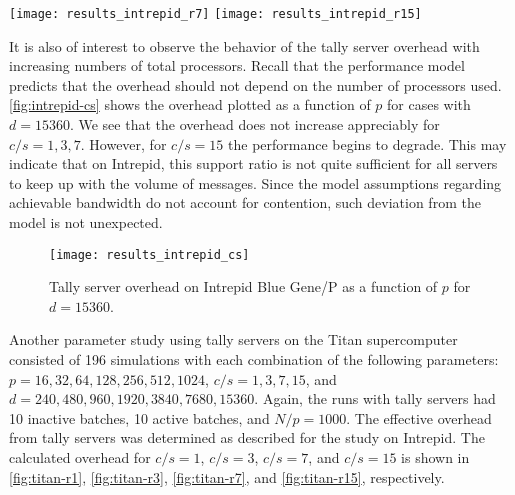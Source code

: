 \documentclass[3p,fleqn]{elsarticle}
\begin{document}
\begin{figure*}[!th]
  \begin{floatrow}
     {\texttt{[image: results\_intrepid\_r7]}}
     {\texttt{[image: results\_intrepid\_r15]}}
  \end{floatrow}
\end{figure*}

It is also of interest to observe the behavior of the tally server overhead with
increasing numbers of total processors. Recall that the performance model
predicts that the overhead should not depend on the number of processors
used. \autoref{fig:intrepid-cs} shows the overhead plotted as a function of $p$
for cases with $d = 15360$. We see that the overhead does not increase
appreciably for $c/s = 1, 3, 7$. However, for $c/s = 15$ the performance begins
to degrade. This may indicate that on Intrepid, this support ratio is not quite
sufficient for all servers to keep up with the volume of messages. Since the
model assumptions regarding achievable bandwidth do not account for contention,
such deviation from the model is not unexpected.

\begin{figure}[!tbh]
  \centering
  \texttt{[image: results\_intrepid\_cs]}
  \caption{Tally server overhead on Intrepid Blue Gene/P as a function of $p$
    for $d = 15360$.}
  \label{fig:intrepid-cs}
\end{figure}

Another parameter study using tally servers on the Titan supercomputer consisted
of 196 simulations with each combination of the following parameters: $p =
16,32,64,128,256,512,1024$, $c/s = 1,3,7,15$, and $d = 240, 480, 960, 1920,
3840, 7680, 15360$. Again, the runs with tally servers had 10 inactive batches,
10 active batches, and $N/p = 1000$. The effective overhead from tally servers
was determined as described for the study on Intrepid. The calculated overhead
for $c/s = 1$, $c/s = 3$, $c/s = 7$, and $c/s = 15$ is shown in
\autoref{fig:titan-r1}, \autoref{fig:titan-r3}, \autoref{fig:titan-r7}, and
\autoref{fig:titan-r15}, respectively.
\end{document}
